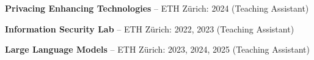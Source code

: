 
\begin{cvparagraph}
\vspace{5.0mm}
\begin{cvitems}
    \item{\textbf{Privacing Enhancing Technologies} -- ETH Zürich: 2024 (Teaching Assistant)}
    \item{\textbf{Information Security Lab} -- ETH Zürich: 2022, 2023 (Teaching Assistant)}
    \item{\textbf{Large Language Models} -- ETH Zürich: 2023, 2024, 2025 (Teaching Assistant)}
\end{cvitems}
\end{cvparagraph}

\vspace{2.5mm}
